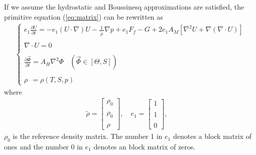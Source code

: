 \documentclass[oribibl]{llncs}
\begin{document}
If we assume the hydrostatic and Boussinesq approximations are satisfied, the primitive equation (\ref{eq:matrix}) can be rewritten as
\begin{eqnarray}\label{eq:hydrostatic}
\left \{
\begin{array}{l}  
e_1 \frac{\partial U}{\partial t} = - e_1 (U \cdot  \nabla){U}  - \frac{\ 1\ }{\widetilde{\rho}} \nabla {p} +e_1 F_f  - G + 2e_1  A_M [\nabla^2 U + \nabla(\nabla \cdot U)] \\   \\ 
 \nabla \cdot U  = 0   \\  \\ 
\frac{\partial \vec{\Phi}}{\partial t}= A_H  \nabla^2 \Phi \ \ \ \ (\vec{\Phi} \in [\Theta,S])  \\  \\ 
\rho \ \ = \rho(T,S,p) 
\end{array}
\right.
\end{eqnarray}
where
\begin{eqnarray}
\widetilde{\rho}=
\left[                 
  \begin{array}{c}  
   \rho_0  \\  \nonumber \\ 
   \rho_0  \\ \nonumber \\ 
   \rho
  \end{array}
\right]
,\quad
e_1=
\left[                 
  \begin{array}{c}  
   1  \\  \nonumber \\ 
   1 \\ \nonumber \\ 
   0
  \end{array}
\right]
,\quad
\end{eqnarray}
$\rho_0$ is the reference density matrix. The number 1 in $e_1$ denotes a block matrix of ones and the number 0 in $e_1$ denotes an block matrix of zeros. 
\end{document}
